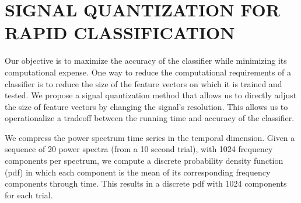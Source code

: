 
\section{\uppercase{Signal Quantization For Rapid Classification}}
\label{sec:quantization}


\noindent Our objective is to maximize the accuracy of the classifier while minimizing its computational expense. One way to reduce the computational requirements of a classifier is to reduce the size of the feature vectors on which it is trained and tested. We propose a signal quantization method that allows us to directly adjust the size of feature vectors by changing the signal's resolution. This allows us to operationalize a tradeoff between the running time and accuracy of the classifier.



We compress the power spectrum time series in the temporal dimension. Given a sequence of 20 power spectra (from a 10 second trial), with 1024 frequency components per spectrum, we compute a discrete probability density function (pdf) in which each component is the mean of its corresponding frequency components through time. This results in a discrete pdf with 1024 components for each trial.


